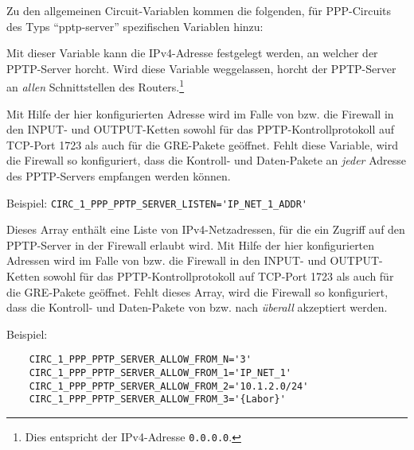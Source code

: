 Zu den allgemeinen Circuit-Variablen kommen die folgenden, für PPP-Circuits
des Typs ``pptp-server'' spezifischen Variablen hinzu:

\begin{description}

Mit dieser Variable kann die IPv4-Adresse festgelegt werden, an welcher der
PPTP-Server horcht. Wird diese Variable weggelassen, horcht der PPTP-Server
an \emph{allen} Schnittstellen des Routers.\footnote{Dies entspricht der
IPv4-Adresse \texttt{0.0.0.0}.}

Mit Hilfe der hier konfigurierten Adresse wird im Falle von
 bzw.
 die Firewall in den
INPUT- und OUTPUT-Ketten sowohl für das PPTP-Kontrollprotokoll auf TCP-Port
1723 als auch für die GRE-Pakete geöffnet. Fehlt diese Variable, wird die
Firewall so konfiguriert, dass die Kontroll- und Daten-Pakete an \emph{jeder}
Adresse des PPTP-Servers empfangen werden können.

Beispiel: \verb+CIRC_1_PPP_PPTP_SERVER_LISTEN='IP_NET_1_ADDR'+


Dieses Array enthält eine Liste von IPv4-Netzadressen, für die ein Zugriff auf
den PPTP-Server in der Firewall erlaubt wird. Mit Hilfe der hier konfigurierten
Adressen wird im Falle von
 bzw.
 die Firewall in den
INPUT- und OUTPUT-Ketten sowohl für das PPTP-Kontrollprotokoll auf TCP-Port
1723 als auch für die GRE-Pakete geöffnet. Fehlt dieses Array, wird die
Firewall so konfiguriert, dass die Kontroll- und Daten-Pakete von bzw. nach
\emph{überall} akzeptiert werden.

Beispiel:

\begin{example}
\begin{verbatim}
    CIRC_1_PPP_PPTP_SERVER_ALLOW_FROM_N='3'
    CIRC_1_PPP_PPTP_SERVER_ALLOW_FROM_1='IP_NET_1'
    CIRC_1_PPP_PPTP_SERVER_ALLOW_FROM_2='10.1.2.0/24'
    CIRC_1_PPP_PPTP_SERVER_ALLOW_FROM_3='{Labor}'
\end{verbatim}
\end{example}


\end{description}
